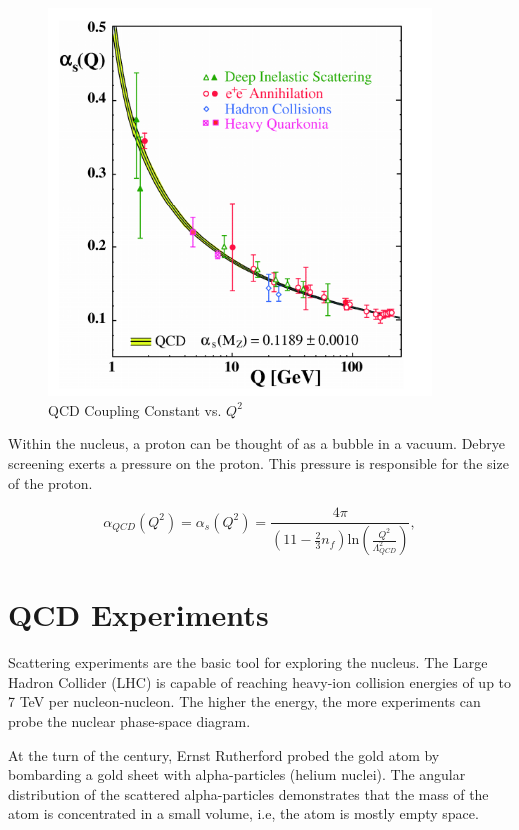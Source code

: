\begin{figure}[h!]
\begin{centering}
\includegraphics[width=4in]{Chapter1/importfigs/qcd_coupling_bethke.png}
\par\end{centering}
\caption{QCD Coupling Constant vs. $Q^2$ \label{fig:runningQCDCoupling}}
\end{figure}

Within the nucleus, a proton can be thought of as a bubble in a vacuum. Debrye screening exerts a pressure on the proton. This pressure is responsible for the size of the proton. 

\begin{equation}
\alpha_{QCD}(Q^2) = \alpha_{s}(Q^2) = \frac{4 \pi }{(11 - \frac{2}{3}n_f)\mathrm{ln}(\frac{Q^2}{\Lambda^2_{QCD}}) } ,
\end{equation}

\section{QCD Experiments}

Scattering experiments are the basic tool for exploring the nucleus. The Large Hadron Collider (LHC) is capable of reaching heavy-ion collision energies of up to 7 TeV per nucleon-nucleon. The higher the energy, the more experiments can probe the nuclear phase-space diagram.

At the turn of the century, Ernst Rutherford probed the gold atom by bombarding a gold sheet with alpha-particles (helium nuclei). The angular distribution of the scattered alpha-particles demonstrates that the mass of the atom is concentrated in a small volume, i.e, the atom is mostly empty space. 


